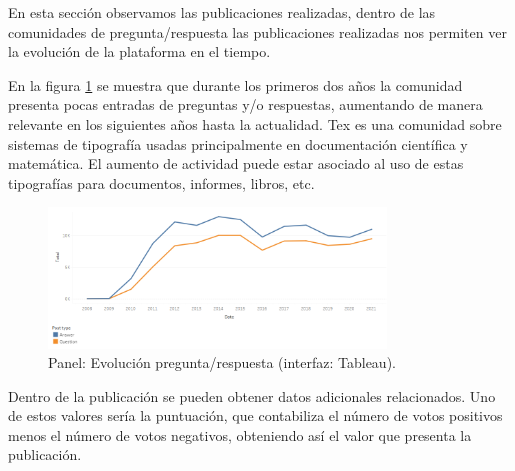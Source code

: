 \documentclass[a4paper, 12pt]{book}
\begin{document}
En esta sección observamos las publicaciones realizadas, dentro de las comunidades de pregunta/respuesta las publicaciones realizadas nos permiten ver la evolución de la plataforma en el tiempo. 

En la figura \ref{figura:evo_post_anual_tex} se muestra que durante los primeros dos años la comunidad presenta pocas entradas de preguntas y/o respuestas, aumentando de manera relevante en los siguientes años hasta la actualidad. Tex es una comunidad sobre sistemas de tipografía usadas principalmente en documentación científica y matemática. El aumento de actividad puede estar asociado al uso de estas tipografías para documentos, informes, libros, etc. 

\begin{figure}[ht]
   \centering
    \includegraphics[width=0.8\textwidth]{img/tex/evo_posts_anual_tex.png}
    \caption{Panel: Evolución pregunta/respuesta (interfaz: Tableau).}
    \label{figura:evo_post_anual_tex}
\end{figure}

Dentro de la publicación se pueden obtener datos adicionales relacionados. Uno de estos valores sería la puntuación, que contabiliza el número de votos positivos menos el número de votos negativos, obteniendo así el valor que presenta la publicación. 
\end{document}
